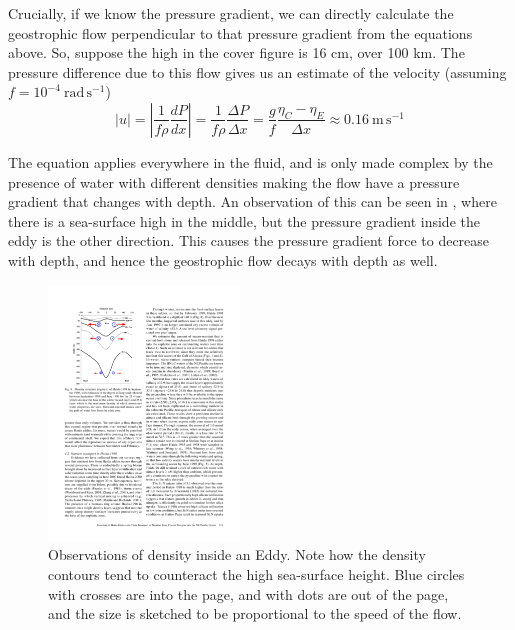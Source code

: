 Crucially, if we know the pressure gradient, we can directly calculate the geostrophic flow perpendicular to that pressure gradient from the equations above.  So, suppose the high in the cover figure is 16 cm, over 100 km.  The pressure difference due to this flow gives us an estimate of the velocity (assuming $f = 10^{-4}\ \mathrm{rad\,s^{-1}}$)
\begin{equation}
  |u| = \left|\frac{1}{f\rho} \frac{dP}{dx}\right| = \frac{1}{f\rho}\frac{\Delta P}{\Delta x} = \frac{g}{f} \frac{\eta_C - \eta_E}{\Delta x} \approx 0.16 \ \mathrm{m\,s^{-1}}
\end{equation}

The equation applies everywhere in the fluid, and is only made complex by the presence of water with different densities making the flow have a pressure gradient that changes with depth.  An observation of this can be seen in , where there is a sea-surface high in the middle, but the pressure gradient inside the eddy is the other direction.  This causes the pressure gradient force to decrease with depth, and hence the geostrophic flow decays with depth as well. 

\begin{figure}
\begin{center}
    \includegraphics[width=2in]{figs/Geostrophic/InteriorEddy}
    \caption{Observations of density inside an Eddy.  Note how the density contours tend to counteract the high sea-surface height.  Blue circles with crosses are into the page, and with dots are out of the page, and the size is sketched to be proportional to the speed of the flow.}
    \label{fig:InteriorEddy}  
\end{center}
\end{figure}

